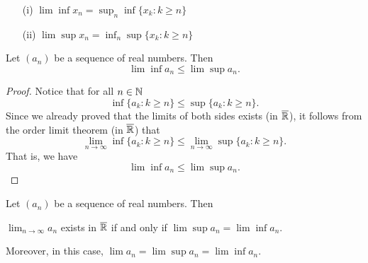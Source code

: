 \documentclass[a4paper]{article}
\begin{document}
\begin{remark}
    \begin{enumerate}
        \item[(i)] \( \lim \inf {x}_{n} = \sup_{n} \inf \{ {x}_{k } : k \geq n  \} \)
        \item[(ii)] \( \lim \sup {x}_{n} = \inf_{n} \sup \{ {x}_{k } : k \geq n  \}  \)
    \end{enumerate}
\end{remark}

\begin{theorem}[ ]
    Let \( ({a}_{n}) \) be a sequence of real numbers. Then
    \[  \lim \inf {a}_{n} \leq \lim \sup {a}_{n}. \]
\end{theorem}
\begin{proof}
Notice that for all \( n \in \mathbb{N}  \)
\[  \inf \{ {a}_{k } : k \geq n  \}  \leq \sup \{ {a}_{k } : k \geq n  \}.  \]
Since we already proved that the limits of both sides exists (in \( \overline{\mathbb{R}} \)), it follows from the order limit theorem (in \( \overline{\mathbb{R}} \)) that 
\[  \lim_{ n \to \infty  }  \inf \{ {a}_{k } : k \geq n  \}  \leq \lim_{ n \to \infty   }  \sup \{ {a}_{k } : k \geq n  \}.  \]
That is, we have 
\[ \lim \inf {a}_{n} \leq \lim \sup {a}_{n}. \]
\end{proof}

\begin{theorem}[ ]
    Let \( ({a}_{n}) \) be a sequence of real numbers. Then
    \begin{center}
        \( \lim_{ n \to \infty  }  {a}_{n} \) exists in \( \overline{\mathbb{R}} \) if and only if \( \lim \sup  {a}_{n} = \lim \inf {a}_{n} \).
    \end{center}
    Moreover, in this case, \( \lim {a}_{n} = \lim \sup {a}_{n} = \lim \inf {a}_{n}\).
\end{theorem}
\end{document}
